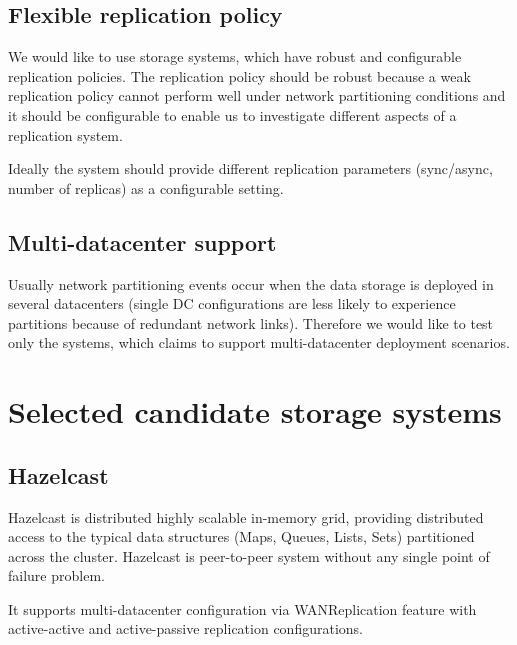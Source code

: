 \documentclass[a4paper]{article}
\begin{document}
\subsection*{Flexible replication policy}
We would like to use storage systems, which have robust and configurable replication policies. 
The replication policy should be robust because a weak replication policy cannot perform well under network partitioning conditions and it should be configurable to enable us to investigate different aspects of a replication system.

Ideally the system should provide different replication parameters (sync/async, number of replicas) as a configurable setting.

\subsection*{Multi-datacenter support}

Usually network partitioning events occur when the data storage is deployed in several datacenters (single DC configurations are less likely to experience partitions because of redundant network links). 
Therefore we would like to test only the systems, which claims to support multi-datacenter deployment scenarios.


\section{Selected candidate storage systems}
\label{sec:candidates}

\subsection*{Hazelcast}
Hazelcast is distributed highly scalable in-memory grid, providing distributed access to the typical data structures (Maps, Queues, Lists, Sets) partitioned across the cluster. 
Hazelcast is peer-to-peer system without any single point of failure problem.

It supports multi-datacenter configuration via WANReplication feature with active-active and active-passive replication configurations.
\end{document}
